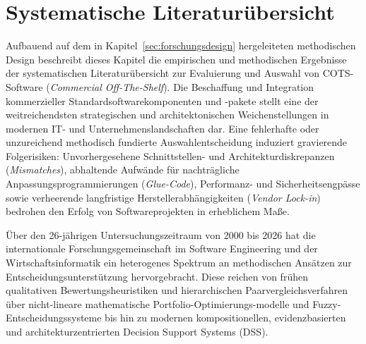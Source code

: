 
\section{Systematische Literaturübersicht}
\label{sec:systematische_literaturuebersicht}

Aufbauend auf dem in Kapitel~\ref{sec:forschungsdesign} hergeleiteten methodischen Design beschreibt dieses Kapitel die empirischen und methodischen Ergebnisse der systematischen Literaturübersicht zur Evaluierung und Auswahl von COTS-Software (\textit{Commercial Off-The-Shelf}). Die Beschaffung und Integration kommerzieller Standardsoftwarekomponenten und -pakete stellt eine der weitreichendsten strategischen und architektonischen Weichenstellungen in modernen IT- und Unternehmenslandschaften dar. Eine fehlerhafte oder unzureichend methodisch fundierte Auswahlentscheidung induziert gravierende Folgerisiken: Unvorhergesehene Schnittstellen- und Architekturdiskrepanzen (\textit{Mismatches}), abhaltende Aufwände für nachträgliche Anpassungsprogrammierungen (\textit{Glue-Code}), Performanz- und Sicherheitsengpässe sowie verheerende langfristige Herstellerabhängigkeiten (\textit{Vendor Lock-in}) bedrohen den Erfolg von Softwareprojekten in erheblichem Maße.

Über den 26-jährigen Untersuchungszeitraum von 2000 bis 2026 hat die internationale Forschungsgemeinschaft im Software Engineering und der Wirtschaftsinformatik ein heterogenes Spektrum an methodischen Ansätzen zur Entscheidungsunterstützung hervorgebracht. Diese reichen von frühen qualitativen Bewertungsheuristiken und hierarchischen Paarvergleichsverfahren über nicht-lineare mathematische Portfolio-Optimierungs-modelle und Fuzzy-Entscheidungssysteme bis hin zu modernen kompositionellen, evidenzbasierten und architekturzentrierten Decision Support Systems (DSS).

